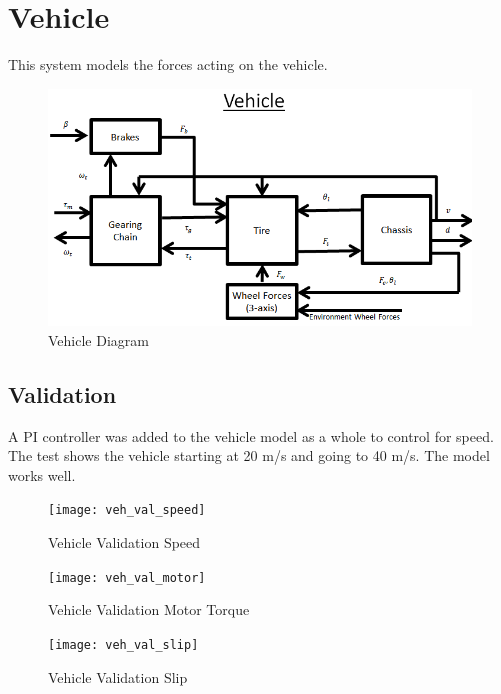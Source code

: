 \documentclass[../SimBALink.tex]{subfiles}
\begin{document}
\section{Vehicle} This system models the forces acting on the vehicle.
\begin{figure}[H]
  \centering
  \includegraphics[scale=.75]{Vehicle_Diagram}
  \caption{Vehicle Diagram}
\end{figure}






\subsection{Validation}
A PI controller was added to the vehicle model as a whole to control for speed. The test shows the vehicle starting at 20 m/s and going to 40 m/s. The model works well.

\begin{figure}[H]
  \centering
  \texttt{[image: veh\_val\_speed]}
  \caption{Vehicle Validation Speed}
\end{figure}

\begin{figure}[H]
  \centering
  \texttt{[image: veh\_val\_motor]}
  \caption{Vehicle Validation Motor Torque}
\end{figure}

\begin{figure}[H]
  \centering
  \texttt{[image: veh\_val\_slip]}
  \caption{Vehicle Validation Slip}
\end{figure}
\end{document}
